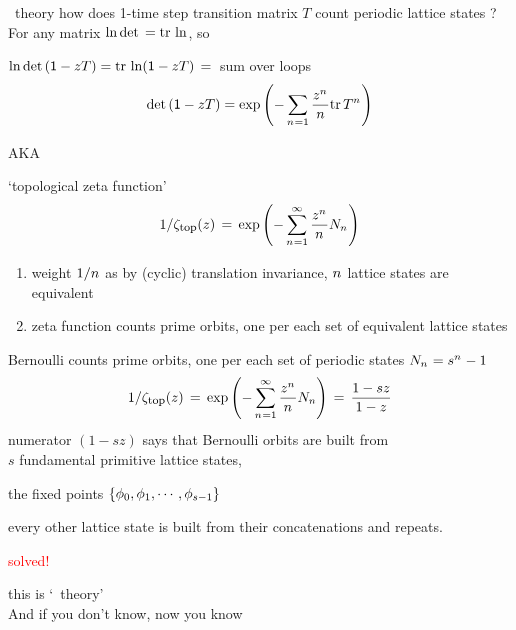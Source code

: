 \begin{frame}{\po\ theory}
how does 1-time step {\color{blue}transition matrix} $T$ count periodic
lattice states ? For any matrix  {\color{blue} $\ln\mbox{\rm det}\,=\mbox{\rm tr}\,\ln$}, so
\begin{block}{$\ln\mbox{\rm det}\,(\mathsf{1}-zT)=\mbox{\rm tr}\,\ln(\mathsf{1}-zT)\,=\,$ sum over loops}
\[
\mbox{\rm det}\,(\mathsf{1}-zT)= \exp \left(-\sum_{{n_{}}=1}\frac{z^{n_{}}}{n}\mbox{\rm tr}\, T^{n_{}}\right)
\]
\end{block}

AKA
\begin{block}{`topological zeta function'}
\[
1/\zeta_{\mbox{\footnotesize top}} (z)
 \,=\,  \exp \left(-\sum_{{n_{}}=1}^\infty
\frac{z^{n_{}}}{{n_{}}} N_{n_{}}
         \right)
\] %
\end{block}
        \begin{enumerate}
              \item
weight ${1}/{{n_{}}}$
as by (cyclic) translation invariance, ${n_{}}$ lattice states are
equivalent
              \item
zeta function counts {\color{blue} prime orbits}, one per each set of equivalent
lattice states
            \end{enumerate}
\end{frame} %

\begin{frame}{Bernoulli \tzeta}
counts {\color{blue}prime orbits},
one per each set of  periodic states $N_{n_{}}=s^{{n_{}}} - 1$
\[
1/\zeta_{\mbox{\footnotesize top}} (z)
 \,=\,  \exp \left(-\sum_{{n_{}}=1}^\infty
\frac{z^{n_{}}}{{n_{}}} N_n
         \right)
\,=\,
\frac{1 -  {s}z}{1 - z}
\] %
numerator $(1 - {s}z)$ says that Bernoulli orbits are built from \\
$s$
fundamental {\color{blue}primitive} lattice states,

\hfill
the fixed points
$\{\phi_0,\phi_1,\cdots,\phi_{s-1}\}$
\medskip

every other lattice state is
built from their concatenations and repeats.

\vfill
\hfill {\Huge \textcolor{red}{solved!}}
\vfill

{\color{blue}this is `\po\ theory'}
\\
 And if you don't know,
 {now you know}

\end{frame} %

